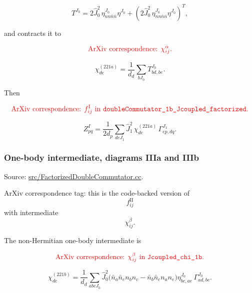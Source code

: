 \documentclass[
]{article}
\begin{document}
\begin{equation}
T^{J_0}=2\hat J_0^2\,\eta_{nn\bar n\bar n}^{J_0}\eta^{J_0}
+\left(2\hat J_0^2\,\eta_{nn\bar n\bar n}^{J_0}\eta^{J_0}\right)^T,
\end{equation}

and contracts it to

\begin{equation}
{\color{red}\text{ArXiv correspondence: }\chi^{\alpha}_{ij}.}
\end{equation}

\begin{equation}
\chi^{(221a)}_{de}
=\frac{1}{d_d}\sum_{bJ_0}T^{J_0}_{bd,be} .
\end{equation}

Then

\begin{equation}
{\color{red}\text{ArXiv correspondence: }f^{\mathrm{I}}_{ij}\text{ in }\texttt{doubleCommutator\_1b\_Jcoupled\_factorized}.}
\end{equation}

\begin{equation}
Z^{I}_{pq}=\frac{1}{2d_p}\sum_{deJ_1}\hat J_1^2\,
\chi^{(221a)}_{de}\,
\Gamma^{J_1}_{ep,dq} .
\end{equation}

\subsubsection{One-body intermediate, diagrams IIIa and
IIIb}\label{one-body-intermediate-diagrams-iiia-and-iiib}

Source:
\href{../src/FactorizedDoubleCommutator.cc\#L257-L371}{src/FactorizedDoubleCommutator.cc}.

ArXiv correspondence tag: this is the code-backed version of \begin{equation}
f^{\mathrm{II}}_{ij}
\end{equation} with intermediate \begin{equation}
\chi^{\beta}_{ij}.
\end{equation}

The non-Hermitian one-body intermediate is

\begin{equation}
{\color{red}\text{ArXiv correspondence: }\chi^{\beta}_{ij}\text{ in }\texttt{Jcoupled\_chi\_1b}.}
\end{equation}

\begin{equation}
\chi^{(221b)}_{de}
=\frac{1}{d_d}
\sum_{abcJ_0}\hat J_0^2
\Big(\bar n_a\bar n_e n_b n_c-\bar n_b\bar n_c n_a n_e\Big)
\eta^{J_0}_{bc,ae}\,
\Gamma^{J_0}_{ad,bc} .
\end{equation}
\end{document}
